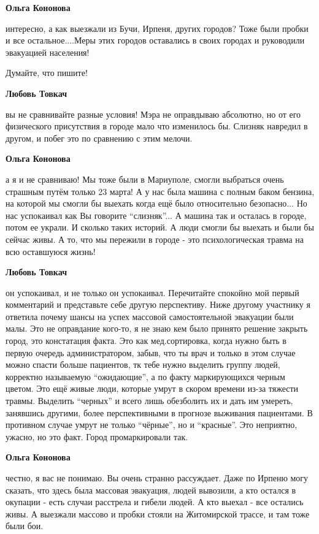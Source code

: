 \begin{itemize} %
\textbf{Ольга Кононова} 

интересно, а как выезжали из Бучи, Ирпеня, других городов? Тоже были пробки и
все остальное....Меры этих городов оставались в своих городах и руководили
эвакуацией населения!

Думайте, что пишите!

\textbf{Любовь Товкач} 

вы не сравнивайте разные условия! Мэра не оправдываю абсолютно, но от его
физического присутствия в городе мало что изменилось бы. Слизняк навредил в
другом, и побег это по сравнению с этим мелочи.

\textbf{Ольга Кононова} 

а я и не сравниваю! Мы тоже были в Мариуполе, смогли выбраться очень страшным
путём только 23 марта! А у нас была машина с полным баком бензина, на которой
мы смогли бы выехать когда ещё было относительно безопасно... Но нас успокаивал
как Вы говорите \enquote{слизняк}... А машина так и осталась в городе, потом ее украли.
И сколько таких историй. А люди смогли бы выехать и были бы сейчас живы. А то,
что мы пережили в городе - это психологическая травма на всю оставшуюся жизнь!

\textbf{Любовь Товкач} 

он успокаивал, и не только он успокаивал. Перечитайте спокойно мой первый
комментарий и представьте себе другую перспективу. Ниже другому участнику я
ответила почему шансы на успех массовой самостоятельной эвакуации были малы.
Это не оправдание кого-то, я не знаю кем было принято решение закрыть город,
это констатация факта. Это как мед.сортировка, когда нужно быть в первую
очередь администратором, забыв, что ты врач и только в этом случае можно спасти
больше пациентов, тк тебе нужно выделить группу людей, корректно называемую
\enquote{ожидающие}, а по факту маркирующихся черным цветом. Это ещё живые люди,
которые умрут в скором времени из-за тяжести травмы. Выделить \enquote{черных} и всего
лишь обезболить их и дать им умереть, занявшись другими, более перспективными в
прогнозе выживания пациентами. В противном случае умрут не только \enquote{чёрные}, но
и \enquote{красные}. Это неприятно, ужасно, но это факт. Город промаркировали так.

\textbf{Ольга Кононова} 

честно, я вас не понимаю. Вы очень странно рассуждает. Даже по Ирпеню могу
сказать, что здесь была массовая эвакуация, людей вывозили, а кто остался в
окупации - есть случаи расстрела и гибели людей. А кто выехал - все остались
живы. А выезжали массово и пробки стояли на Житомирской трассе, и там тоже были
бои.


\end{itemize}
